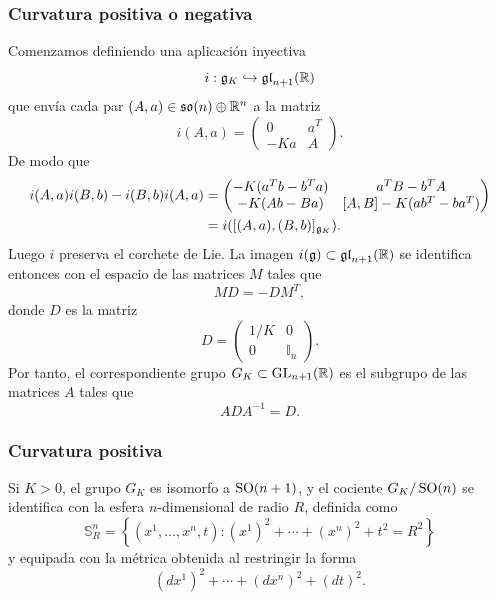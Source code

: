 \documentclass[11pt,a4paper]{amsbook}
\theoremstyle{remark} \newtheorem{rmk}[subsection]{Observación}
\theoremstyle{definition} \newtheorem{defn}[subsection]{Definición}
\theoremstyle{definition} \newtheorem{ex}[subsection]{Ejemplo}
\theoremstyle{definition} \newtheorem{ej}[subsection]{Ejercicio}
\begin{document}
\subsubsection{Curvatura positiva o negativa}
Comenzamos definiendo una aplicación inyectiva
\begin{equation*}
i:\mathfrak{g}_K \hookrightarrow \mathfrak{gl}_{n+1}(\mathbb R)
\end{equation*}
que envía cada par $(A,a) \in \mathfrak{so}(n) \oplus \mathbb R^n$ a la matriz
\begin{equation*}
  i(A,a)=
\begin{pmatrix}
  0 & a^T \\
  -K a & A
\end{pmatrix}.
\end{equation*}
De modo que
\begin{align*}
i(A,a) i(B,b) - i(B,b) i (A,a) &=
\begin{pmatrix}
  -K(a^Tb - b^Ta) & a^T B - b^T A \\
  -K (Ab - Ba) & [A,B] -K(ab^T - ba^T)
\end{pmatrix} \\
  & = i([(A,a),(B,b)]_{\mathfrak{g}_K}).
\end{align*}
Luego $i$ preserva el corchete de Lie. La imagen $i(\mathfrak{g})\subset \mathfrak{gl}_{n+1}(\mathbb R)$ se identifica entonces con el espacio de las matrices $M$ tales que
\begin{equation*}
MD = -D M^T,
\end{equation*}
donde $D$ es la matriz
\begin{equation*}
  D=
\begin{pmatrix}
  1/K & 0\\
   0 & \mathbb{I}_n
\end{pmatrix}.
\end{equation*}
Por tanto, el correspondiente grupo $G_K\subset \operatorname{GL}_{n+1}(\mathbb R)$ es el subgrupo de las matrices $A$ tales que
\begin{equation*}
A D A^{-1} = D.
\end{equation*}

\subsubsection{Curvatura positiva} Si $K>0$, el grupo $G_K$ es isomorfo a $\operatorname{SO}(n+1)$, y el cociente $G_K/\operatorname{SO}(n)$ se identifica con la esfera $n$-dimensional de radio $R$, definida como
\begin{equation*}
\mathbb{S}^n_R = \left\{ (x^1,\dots,x^n,t): (x^1)^2 + \cdots + (x^n)^2 + t^2 = R^2 \right\}
\end{equation*}
y equipada con la métrica obtenida al restringir  la forma
\begin{equation*}
  (dx^1)^2 + \cdots + (dx^n)^2 + (dt)^2 .
\end{equation*}
\end{document}
